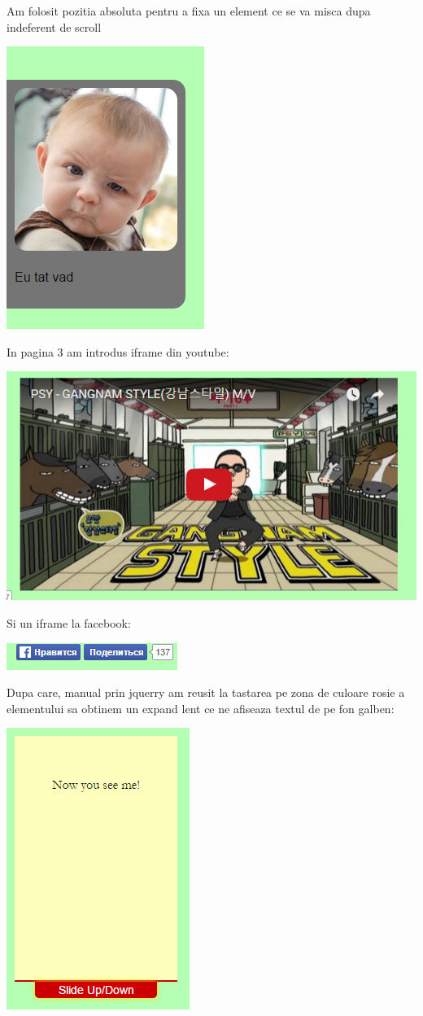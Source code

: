 Am folosit pozitia absoluta pentru a fixa un element ce se va misca dupa indeferent de scroll
\begin{center}
\includegraphics[width=0.4\linewidth]{9}
\end{center}
In pagina 3 am introdus iframe din youtube:
\begin{center}
\includegraphics[width=0.7\linewidth]{10}
\end{center}
Si un iframe la facebook:
\begin{center}
\includegraphics[width=0.7\linewidth]{11}
\end{center}
Dupa care, manual prin jquerry am reusit la tastarea pe zona de culoare rosie a elementului sa obtinem un expand lent ce ne afiseaza textul de pe fon galben:
\begin{center}
\includegraphics[width=0.3\linewidth]{12}
\end{center}
